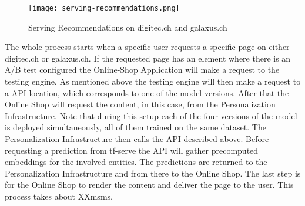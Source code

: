 \begin{figure}[H]
	\centering
	\captionsetup{width=0.8\textwidth}
    \texttt{[image: serving-recommendations.png]}
    \caption{Serving Recommendations on digitec.ch and galaxus.ch}
    \label{fig:serving_recs}
\end{figure}

The whole process starts when a specific user requests a specific page on either digitec.ch or galaxus.ch.
If the requested page has an element where there is an A/B test configured the Online-Shop Application will make a request to the testing engine.
As mentioned above the testing engine will then make a request to a API location, which corresponds to one of the model versions.
After that the Online Shop will request the content, in this case, from the Personalization Infrastructure.
Note that during this setup each of the four versions of the model is deployed simultaneously, all of them trained on the same dataset.
The Personalization Infrastructure then calls the API described above.
Before requesting a prediction from tf-serve the API will gather precomputed embeddings for the involved entities.
The predictions are returned to the Personalization Infrastructure and from there to the Online Shop.
The last step is for the Online Shop to render the content and deliver the page to the user.
This process takes about XXmsms.